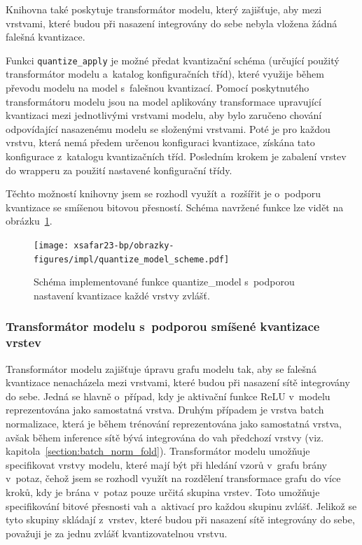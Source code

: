 Knihovna také poskytuje transformátor modelu, který zajišťuje, aby mezi vrstvami, které budou při nasazení integrovány do sebe nebyla vložena žádná falešná kvantizace.

Funkci \verb|quantize_apply| je možné předat kvantizační schéma (určující použitý transformátor modelu a~katalog konfiguračních tříd), které využije během převodu modelu na model s~falešnou kvantizací. Pomocí poskytnutého transformátoru modelu jsou na model aplikovány transformace upravující kvantizaci mezi jednotlivými vrstvami modelu, aby bylo zaručeno chování odpovídající nasazenému modelu se složenými vrstvami. Poté je pro každou vrstvu, která nemá předem určenou konfiguraci kvantizace, získána tato konfigurace z~katalogu kvantizačních tříd. Posledním krokem je zabalení vrstev do wrapperu za použití nastavené konfigurační třídy.

Těchto možností knihovny jsem se rozhodl využít a~rozšířit je o~podporu kvantizace se smíšenou bitovou přesností. Schéma navržené funkce lze vidět na obrázku~\ref{fig:quantize_model-impl}.
\begin{figure}[H]
	\centering
	\texttt{[image: xsafar23-bp/obrazky-figures/impl/quantize\_model\_scheme.pdf]}
	\caption{Schéma implementované funkce quantize\_model s~podporou nastavení kvantizace každé vrstvy zvlášť.}
	\label{fig:quantize_model-impl} 
\end{figure}

\subsubsection{Transformátor modelu s~podporou smíšené kvantizace vrstev}

Transformátor modelu zajišťuje úpravu grafu modelu tak, aby se falešná kvantizace nenacházela mezi vrstvami, které budou při nasazení sítě integrovány do sebe. Jedná se hlavně o~případ, kdy je aktivační funkce ReLU v~modelu reprezentována jako samostatná vrstva. Druhým případem je vrstva batch normalizace, která je během trénování reprezentována jako samostatná vrstva, avšak během inference sítě bývá integrována do vah předchozí vrstvy (viz. kapitola~\ref{section:batch_norm_fold}). Transformátor modelu umožňuje specifikovat vrstvy modelu, které mají být při hledání vzorů v~grafu brány v~potaz, čehož jsem se rozhodl využít na rozdělení transformace grafu do více kroků, kdy je brána v~potaz pouze určitá skupina vrstev. Toto umožňuje specifikování bitové přesnosti vah a~aktivací pro každou skupinu zvlášť. Jelikož se tyto skupiny skládají z~vrstev, které budou při nasazení sítě integrovány do sebe, považuji je za jednu zvlášť kvantizovatelnou vrstvu. 

